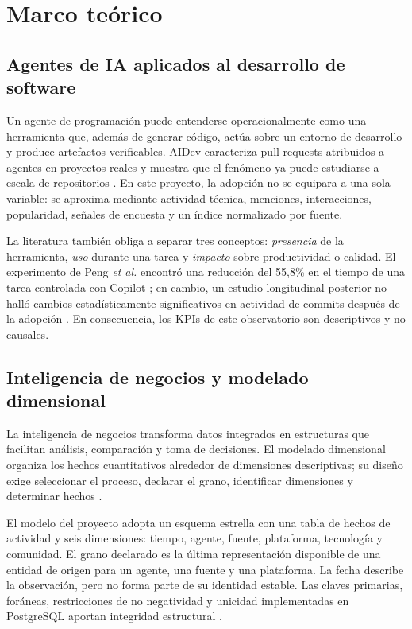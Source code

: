\documentclass[12pt,a4paper]{article}
\begin{document}
\section{Marco teórico}

\subsection{Agentes de IA aplicados al desarrollo de software}

Un agente de programación puede entenderse operacionalmente como una herramienta que, además de generar código, actúa sobre un entorno de desarrollo y produce artefactos verificables. AIDev caracteriza pull requests atribuidos a agentes en proyectos reales y muestra que el fenómeno ya puede estudiarse a escala de repositorios \cite{aidev_paper}. En este proyecto, la adopción no se equipara a una sola variable: se aproxima mediante actividad técnica, menciones, interacciones, popularidad, señales de encuesta y un índice normalizado por fuente.

La literatura también obliga a separar tres conceptos: \emph{presencia} de la herramienta, \emph{uso} durante una tarea y \emph{impacto} sobre productividad o calidad. El experimento de Peng \emph{et al.} encontró una reducción del 55,8\% en el tiempo de una tarea controlada con Copilot \cite{peng_copilot}; en cambio, un estudio longitudinal posterior no halló cambios estadísticamente significativos en actividad de commits después de la adopción \cite{stray_copilot}. En consecuencia, los KPIs de este observatorio son descriptivos y no causales.

\subsection{Inteligencia de negocios y modelado dimensional}

La inteligencia de negocios transforma datos integrados en estructuras que facilitan análisis, comparación y toma de decisiones. El modelado dimensional organiza los hechos cuantitativos alrededor de dimensiones descriptivas; su diseño exige seleccionar el proceso, declarar el grano, identificar dimensiones y determinar hechos \cite{kimball_book,kimball_process}.

El modelo del proyecto adopta un esquema estrella con una tabla de hechos de actividad y seis dimensiones: tiempo, agente, fuente, plataforma, tecnología y comunidad. El grano declarado es la última representación disponible de una entidad de origen para un agente, una fuente y una plataforma. La fecha describe la observación, pero no forma parte de su identidad estable. Las claves primarias, foráneas, restricciones de no negatividad y unicidad implementadas en PostgreSQL aportan integridad estructural \cite{postgres_constraints}.
\end{document}
